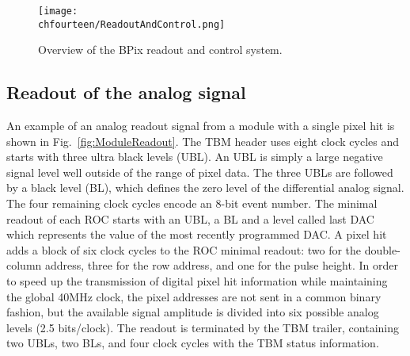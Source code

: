 \begin{figure}[!htb]
 \begin{center}
 \texttt{[image: \\chfourteen/ReadoutAndControl.png]}
 \end{center}
 \caption{Overview of the BPix readout and control system.}
 \label{fig:BPixSystem}
\end{figure}

\subsection{Readout of the analog signal}\label{subsec:BPixReadout}

An example of an analog readout signal from a module with a single pixel hit is shown in Fig.~\ref{fig:ModuleReadout}.
The TBM header uses eight clock cycles and starts with three ultra black levels (UBL). An UBL is simply a large negative signal level well outside of the range of pixel data.
The three UBLs are followed by a black level (BL), which defines the zero level of the differential analog signal.
The four remaining clock cycles encode an 8-bit event number.
The minimal readout of each ROC starts with an UBL, a BL and a level called last DAC which represents the value of the most recently programmed DAC.
A pixel hit adds a block of six clock cycles to the ROC minimal readout: two for the double-column address, three for the row address, and one for the pulse height.
In order to speed up the transmission of digital pixel hit information while maintaining the global 40\unit{MHz} clock,
the pixel addresses are not sent in a common binary fashion, but the available signal amplitude is divided into six possible analog levels (2.5 bits/clock).
The readout is terminated by the TBM trailer, containing two UBLs, two BLs, and four clock cycles with the TBM status information.


